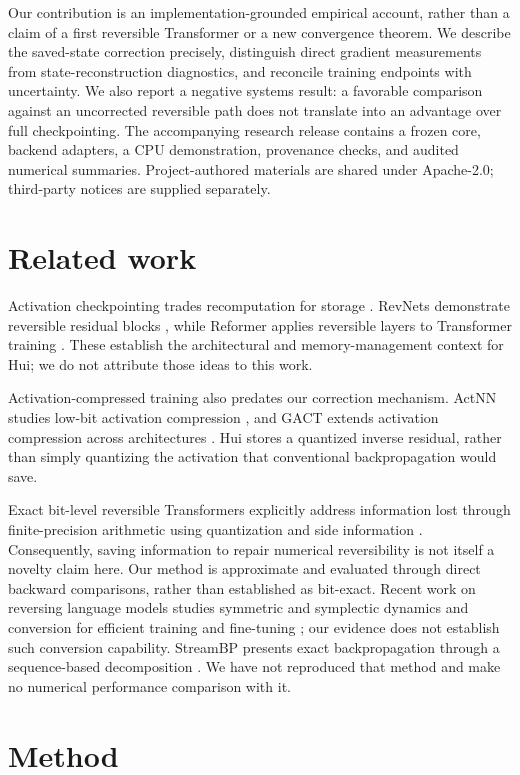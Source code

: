\documentclass[10pt]{article}
\begin{document}
Our contribution is an implementation-grounded empirical account, rather than a claim of a first reversible Transformer or a new convergence theorem. We describe the saved-state correction precisely, distinguish direct gradient measurements from state-reconstruction diagnostics, and reconcile training endpoints with uncertainty. We also report a negative systems result: a favorable comparison against an uncorrected reversible path does not translate into an advantage over full checkpointing. The accompanying research release contains a frozen core, backend adapters, a CPU demonstration, provenance checks, and audited numerical summaries. Project-authored materials are shared under Apache-2.0; third-party notices are supplied separately.

\section{Related work}
Activation checkpointing trades recomputation for storage \cite{chen2016}. RevNets demonstrate reversible residual blocks \cite{gomez2017}, while Reformer applies reversible layers to Transformer training \cite{kitaev2020}. These establish the architectural and memory-management context for Hui; we do not attribute those ideas to this work.

Activation-compressed training also predates our correction mechanism. ActNN studies low-bit activation compression \cite{chen2021}, and GACT extends activation compression across architectures \cite{liu2022}. Hui stores a quantized inverse residual, rather than simply quantizing the activation that conventional backpropagation would save.

Exact bit-level reversible Transformers explicitly address information lost through finite-precision arithmetic using quantization and side information \cite{zhang2025}. Consequently, saving information to repair numerical reversibility is not itself a novelty claim here. Our method is approximate and evaluated through direct backward comparisons, rather than established as bit-exact. Recent work on reversing language models studies symmetric and symplectic dynamics and conversion for efficient training and fine-tuning \cite{gal2025}; our evidence does not establish such conversion capability. StreamBP presents exact backpropagation through a sequence-based decomposition \cite{luo2025}. We have not reproduced that method and make no numerical performance comparison with it.

\section{Method}
\end{document}
